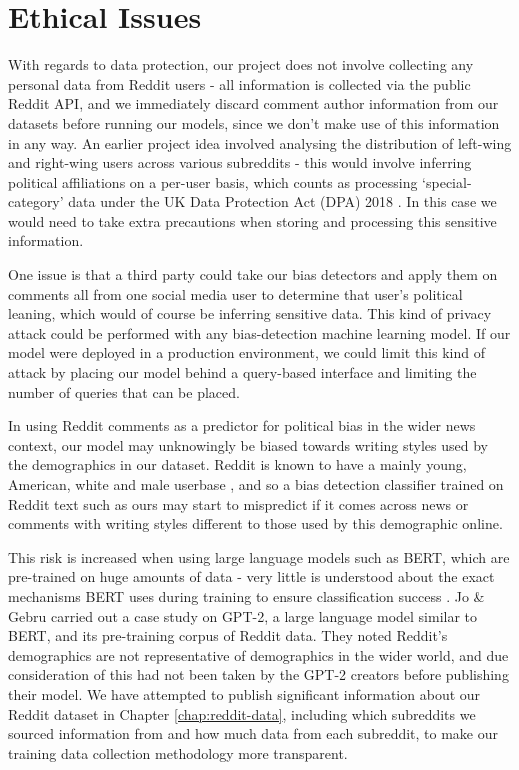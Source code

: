 \section{Ethical Issues}

With regards to data protection, our project does not involve collecting any personal data from Reddit users - all information is collected via the public Reddit API, and we immediately discard comment author information from our datasets before running our models, since we don't make use of this information in any way. An earlier project idea involved analysing the distribution of left-wing and right-wing users across various subreddits - this would involve inferring political affiliations on a per-user basis, which counts as processing `special-category' data under the UK Data Protection Act (DPA) 2018 \cite{dpa}. In this case we would need to take extra precautions when storing and processing this sensitive information.

One issue is that a third party could take our bias detectors and apply them on comments all from one social media user to determine that user's political leaning, which would of course be inferring sensitive data. This kind of privacy attack could be performed with any bias-detection machine learning model. If our model were deployed in a production environment, we could limit this kind of attack by placing our model behind a query-based interface and limiting the number of queries that can be placed.

In using Reddit comments as a predictor for political bias in the wider news context, our model may unknowingly be biased towards writing styles used by the demographics in our dataset. Reddit is known to have a mainly young, American, white and male userbase \cite{pew-reddit-demographics}, and so a bias detection classifier trained on Reddit text such as ours may start to mispredict if it comes across news or comments with writing styles different to those used by this demographic online. 

This risk is increased when using large language models such as BERT, which are pre-trained on huge amounts of data - very little is understood about the exact mechanisms BERT uses during training to ensure classification success \cite{bert-dark-secrets}. Jo \& Gebru \cite{gebru} carried out a case study on GPT-2, a large language model similar to BERT, and its pre-training corpus of Reddit data. They noted Reddit's demographics are not representative of demographics in the wider world, and due consideration of this had not been taken by the GPT-2 creators before publishing their model. We have attempted to publish significant information about our Reddit dataset in Chapter \ref{chap:reddit-data}, including which subreddits we sourced information from and how much data from each subreddit, to make our training data collection methodology more transparent.

